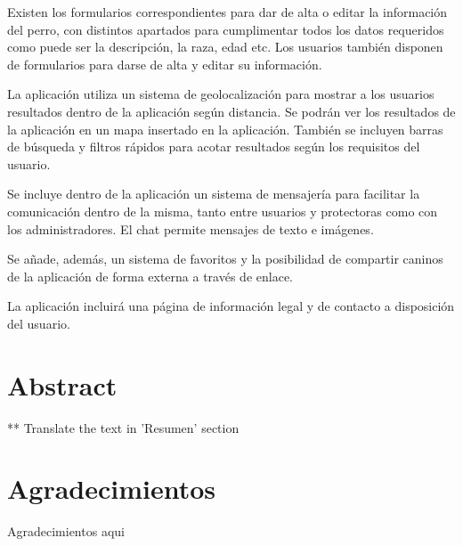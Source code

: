 \documentclass[a4paper, 12pt]{article}
\begin{document}
Existen los formularios correspondientes para dar de alta o editar la información del perro, con distintos apartados para cumplimentar todos los datos requeridos como puede ser la descripción, la raza, edad etc. Los usuarios también disponen de formularios para darse de alta y editar su información.

La aplicación utiliza un sistema de geolocalización para mostrar a los usuarios resultados dentro de la aplicación según distancia. Se podrán ver los resultados de la aplicación en un mapa insertado en la aplicación. También se incluyen barras de búsqueda y filtros rápidos para acotar resultados según los requisitos del usuario.

Se incluye dentro de la aplicación un sistema de mensajería para facilitar la comunicación dentro de la misma, tanto entre usuarios y protectoras como con los administradores. El chat permite mensajes de texto e imágenes.

Se añade, además, un sistema de favoritos y la posibilidad de compartir caninos de la aplicación de forma externa a través de enlace. 

La aplicación incluirá una página de información legal y de contacto a disposición del usuario.


\newpage
\pagestyle{plain}
\thispagestyle{empty}
\mbox{}

\newpage
\section*{Abstract}
** Translate the text in 'Resumen' section

\newpage
\thispagestyle{empty}
\mbox{}

\newpage
\section*{Agradecimientos}
\begin{center} 
\vspace*{\fill}
Agradecimientos aqui
\vspace*{\fill}
\end{center} 

\newpage
\thispagestyle{empty}
\mbox{}
\newpage
\thispagestyle{empty}
\mbox{}

\tableofcontents
\listoftables
\listoffigures

\newpage
\thispagestyle{empty}
\mbox{}
\end{document}
